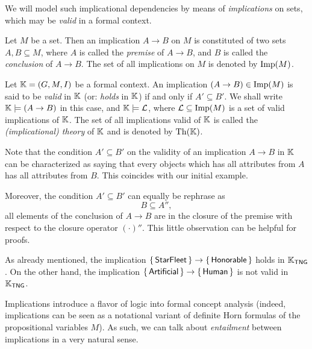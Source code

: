 We will model such implicational dependencies by means of \emph{implications} on sets,
which may be \emph{valid} in a formal context.

\begin{Definition}
  Let $M$ be a set.  Then an implication $A \to B$ on $M$ is constituted of two sets $A, B
  \subseteq M$, where $A$ is called the \emph{premise} of $A \to B$, and $B$ is called the
  \emph{conclusion} of $A \to B$.  The set of all implications on $M$ is denoted by
  $\operatorname{Imp}(M)$.

  Let ${\mathbb{K}} = (G, M, I)$ be a formal context.  An implication $(A \to B) \in \operatorname{Imp}(M)$ is
  said to be \emph{valid} in ${\mathbb{K}}$ (or: \emph{holds} in ${\mathbb{K}}$) if and only if $A'
  \subseteq B'$.  We shall write ${\mathbb{K}} \models (A \to B)$ in this case, and ${\mathbb{K}}
  \models \mathcal{L}$, where $\mathcal{L} \subseteq \operatorname{Imp}(M)$ is a set of valid
  implications of ${\mathbb{K}}$.  The set of all implications valid of ${\mathbb{K}}$ is called the
  \emph{(implicational) theory} of ${\mathbb{K}}$ and is denoted by $\operatorname{Th}({\mathbb{K}})$.
\end{Definition}

Note that the condition $A' \subseteq B'$ on the validity  of an implication $A \to B$ in
${\mathbb{K}}$ can be characterized as saying that every objects which has all attributes from
$A$ has all attributes from $B$.  This coincides with our initial example.

Moreover, the condition $A' \subseteq B'$ can equally be rephrase as
\begin{equation}
  \label{eq:6}
  B \subseteq A'',
\end{equation}
\ie all elements of the conclusion of $A \to B$ are in the closure of the premise with
respect to the closure operator $(\cdot)''$.  This little observation can be helpful for
proofs.

\begin{Example}
  \label{expl:6}
  As already mentioned, the implication ${\{\, \mathsf{StarFleet} \,\}} \to {\ensuremath{\{\,
    \mathsf{Honorable} \,\}}}$ holds in ${\mathbb{K}}_{\mathsf{TNG}}$.  On the other hand, the
  implication ${\{\, \mathsf{Artificial} \,\}} \to {\ensuremath{\{\, \mathsf{Human} \,\}}}$ is not valid in
  ${\mathbb{K}}_{\mathsf{TNG}}$.
\end{Example}

Implications introduce a flavor of logic into formal concept analysis (indeed,
implications can be seen as a notational variant of definite Horn formulas of the
propositional variables $M$).  As such, we can talk about \emph{entailment} between
implications in a very natural sense.


